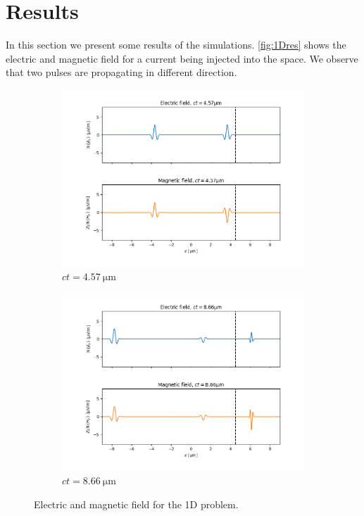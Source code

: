 \documentclass[a4paper,12pt]{scrartcl}
\begin{document}
\section{Results}
    In this section we present some results of the simulations.
    \autoref{fig:1Dres} shows the electric and magnetic field for 
    a current being injected into the space.
    We observe that two pulses are propagating in different direction.
    \begin{figure}[H]
        \begin{subfigure}{.5\textwidth}
            \centering
            \includegraphics[width=\textwidth]{figures/Figure_1D1.png}
            \caption{$ct = \SI{4.57}{\micro\meter}$}
            \label{fig:1Dl}
        \end{subfigure}
        \begin{subfigure}{.5\textwidth}
            \centering
            \includegraphics[width=\textwidth]{figures/Figure_1D2.png}
            \caption{$ct = \SI{8.66}{\micro\meter}$}
            \label{fig:1Dr}
        \end{subfigure}
        \caption{Electric and magnetic field for the 1D problem.}
        \label{fig:1Dres}
    \end{figure}
\end{document}
